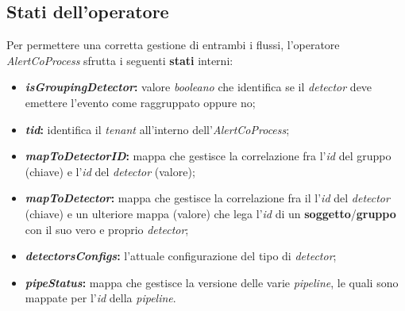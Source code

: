 \subsection{Stati dell'operatore}\label{sec:stati-alertcoprocess}
Per permettere una corretta gestione di entrambi i flussi, l'operatore \textit{AlertCoProcess} sfrutta i seguenti \textbf{stati} interni:
\begin{itemize}
		\item{\textbf{\textit{isGroupingDetector}:} valore \textit{booleano} che identifica se il \textit{detector} deve emettere l'evento come raggruppato oppure no;}
		\item{\textbf{\textit{tid}:} identifica il \textit{tenant} all'interno dell'\textit{AlertCoProcess};}
		\item{\textbf{\textit{mapToDetectorID}:} mappa che gestisce la correlazione fra l'\textit{id} del gruppo (chiave) e l'\textit{id} del \textit{detector} (valore);}
		\item{\textbf{\textit{mapToDetector}:} mappa che gestisce la correlazione fra il l'\textit{id} del \textit{detector} (chiave) e un ulteriore mappa (valore) che lega l'\textit{id} di un \textbf{soggetto}/\textbf{gruppo} con il suo vero e proprio \textit{detector};}
		\item{\textbf{\textit{detectorsConfigs}:} l'attuale configurazione del tipo di \textit{detector};}
		\item{\textbf{\textit{pipeStatus}:} mappa che gestisce la versione delle varie \textit{\gls{pipeline}}, le quali sono mappate per l'\textit{id} della \textit{\gls{pipeline}}.}
\end{itemize}

